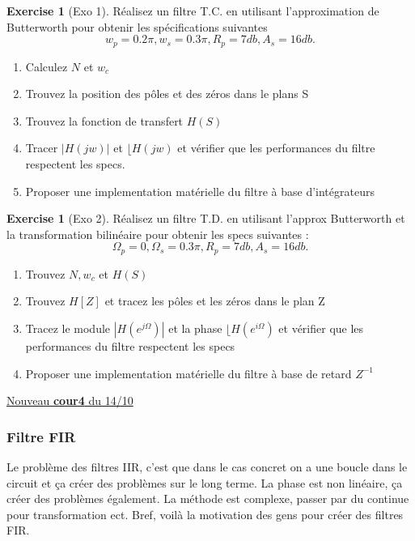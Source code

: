 \documentclass{article}
\theoremstyle{plain}%
\theoremstyle{definition}
\newtheorem{xca}[exmp]{Exercise}
\theoremstyle{remark}
\begin{document}
\begin{xca}[Exo 1]
    Réalisez un filtre T.C. en utilisant l'approximation de Butterworth pour obtenir les spécifications suivantes 
    \[
        w_p = 0.2 \pi, w_s=0.3 \pi , R_p = 7 db, A_s = 16 db
    .\]
    \begin{enumerate}
        \item Calculez $ N $ et $ w_c $
        \item Trouvez la position des pôles et des zéros dans le plans S
        \item Trouvez la fonction de transfert $ H(S) $
        \item Tracer $ \left| H(jw) \right|  $ et $ \lfloor H(jw) $ et vérifier que les performances du filtre respectent les specs.
        \item Proposer une implementation matérielle du filtre à base d'intégrateurs
    \end{enumerate}
\end{xca}

\begin{xca}[Exo 2]
    Réalisez un filtre T.D. en utilisant l'approx Butterworth et la transformation bilinéaire pour obtenir les specs suivantes : 
    \[
        \Omega _p = 0, \Omega _s = 0.3 \pi, R_p = 7db, A_s = 16 db
    .\]
    \begin{enumerate}
        \item Trouvez $ N, w_c $ et $ H(S) $ 
        \item Trouvez $ H[Z] $ et tracez les pôles et les zéros dans le plan Z
        \item Tracez le module $ \left| H(e^{j \Omega }) \right| $ et la phase $ \lfloor H(e^{i \Omega }) $ et vérifier que les performances du filtre respectent les specs
        \item Proposer une implementation matérielle du filtre à base de retard $ Z^{-1} $ 
    \end{enumerate}
\end{xca}

\underline{Nouveau \textbf{cour4} du 14/10} \\

\subsubsection{Filtre FIR}
Le problème des filtres IIR, c'est que dans le cas concret on a une boucle dans le circuit et ça créer des problèmes sur le long terme. La phase est non linéaire, ça créer des problèmes également. La méthode est complexe, passer par du continue pour transformation ect. Bref, voilà la motivation des gens pour créer des filtres FIR. 
\end{document}
